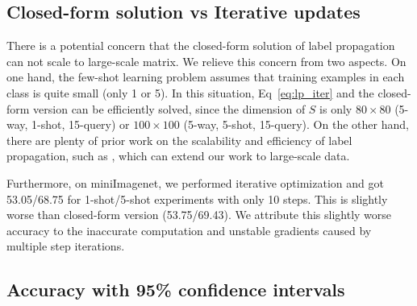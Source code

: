 \documentclass{article} \usepackage{iclr2019_conference,times}
\begin{document}
\subsection{Closed-form solution vs Iterative updates}
\label{sec:time}

There is a potential concern that the closed-form solution of label propagation can not scale to large-scale matrix. 
We relieve this concern from two aspects. On one hand, the few-shot learning problem assumes that training examples in each class is quite small (only 1 or 5). In this situation, Eq~\ref{eq:lp_iter} and the closed-form version can be efficiently solved, since the dimension of $S$ is only $80\times 80$ (5-way, 1-shot, 15-query) or $100\times 100$ (5-way, 5-shot, 15-query). On the other hand, there are plenty of prior work on the scalability and efficiency of label propagation, such as \cite{scale1,scale2}, which can extend our work to large-scale data. 

Furthermore, on miniImagenet, we performed iterative optimization and got 53.05/68.75 for 1-shot/5-shot experiments with only 10 steps. This is slightly worse than closed-form version (53.75/69.43). We attribute this slightly worse accuracy to the inaccurate computation and unstable gradients caused by multiple step iterations. 






\subsection{Accuracy with 95\% confidence intervals}
\label{sec:std}
\end{document}
